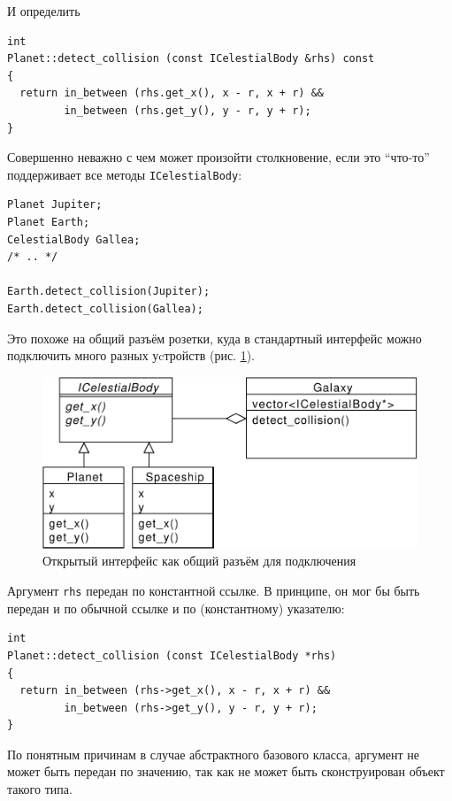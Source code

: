 \documentclass[a4paper,12pt,oneside]{book}
\begin{document}
И определить

\begin{lstlisting}
int 
Planet::detect_collision (const ICelestialBody &rhs) const
{
  return in_between (rhs.get_x(), x - r, x + r) && 
         in_between (rhs.get_y(), y - r, y + r);
}
\end{lstlisting}

Совершенно неважно с чем может произойти столкновение, если это ``что-то'' поддерживает все методы \lstinline!ICelestialBody!:

\begin{lstlisting}
Planet Jupiter;
Planet Earth;
CelestialBody Gallea;
/* .. */

Earth.detect_collision(Jupiter); 
Earth.detect_collision(Gallea);
\end{lstlisting}

Это похоже на общий разъём розетки, куда в стандартный интерфейс можно подключить много разных уcтройств (рис. \ref{fig:common-intf}).

\begin{figure}[ht]
\centering
\includegraphics[width=1.0\textwidth]{illustrations/common-intf-crop.pdf}
\caption{Открытый интерфейс как общий разъём для подключения}
\label{fig:common-intf}
\end{figure}

Аргумент \lstinline!rhs! передан по константной ссылке. В принципе, он мог бы быть передан и по обычной ссылке и по (константному) указателю:

\begin{lstlisting}
int 
Planet::detect_collision (const ICelestialBody *rhs)
{
  return in_between (rhs->get_x(), x - r, x + r) && 
         in_between (rhs->get_y(), y - r, y + r);
}
\end{lstlisting}

По понятным причинам в случае абстрактного базового класса, аргумент не может быть передан по значению, так как не может быть сконструирован объект такого типа.
\end{document}
